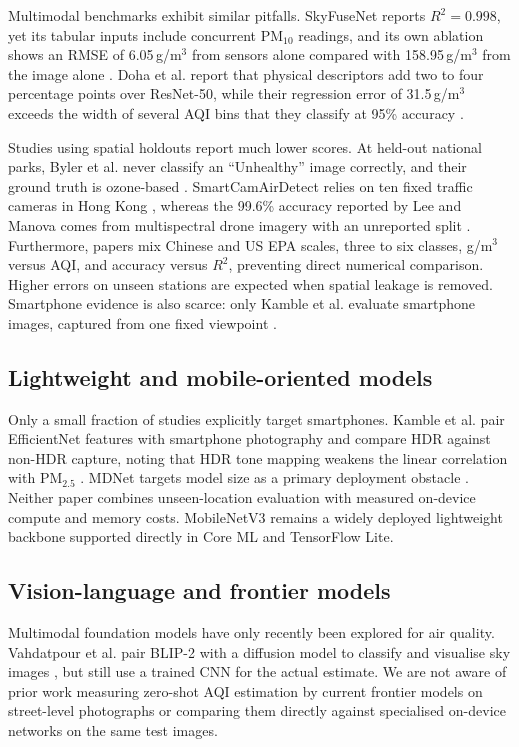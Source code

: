 \documentclass[conference]{IEEEtran}
\newcommand{\pmtwofive}{PM$_{2.5}$}
\begin{document}
Multimodal benchmarks exhibit similar pitfalls. SkyFuseNet reports $R^2=0.998$,
yet its tabular inputs include concurrent PM$_{10}$ readings, and its own
ablation shows an RMSE of 6.05\,\textmu g/m$^3$ from sensors alone compared with
158.95\,\textmu g/m$^3$ from the image alone
\cite{abdelsalamSkyFuseNetCrossAttentionSwin2026}. Doha et al. report that
physical descriptors add two to four percentage points over ResNet-50, while
their regression error of 31.5\,\textmu g/m$^3$ exceeds the width of several
AQI bins that they classify at 95\% accuracy
\cite{dohaDeepMultiTaskLearning2026}.

Studies using spatial holdouts report much lower scores. At held-out national
parks, Byler et al. never classify an ``Unhealthy'' image correctly, and their
ground truth is ozone-based \cite{bylerLocationGeneralizabilityImageBased2025}.
SmartCamAirDetect relies on ten fixed traffic cameras in Hong Kong
\cite{hanSmartCamAirDetectContrastiveApproach2025}, whereas the 99.6\% accuracy
reported by Lee and Manova comes from multispectral drone imagery with an
unreported split \cite{leeEnhancingPM25Detection2025}. Furthermore, papers mix
Chinese and US EPA scales, three to six classes, \textmu g/m$^3$ versus AQI,
and accuracy versus $R^2$, preventing direct numerical comparison. Higher errors
on unseen stations are expected when spatial leakage is removed. Smartphone
evidence is also scarce: only Kamble et al. evaluate smartphone images, captured
from one fixed viewpoint \cite{kambleMobileImageDrivenPM252025}.

\subsection{Lightweight and mobile-oriented models}
Only a small fraction of studies explicitly target smartphones. Kamble et al.
pair EfficientNet features with smartphone photography and compare HDR against
non-HDR capture, noting that HDR tone mapping weakens the linear correlation
with \pmtwofive{} \cite{kambleMobileImageDrivenPM252025}. MDNet targets model
size as a primary deployment obstacle \cite{wangLightweightAirQuality2024}.
Neither paper combines unseen-location evaluation with measured on-device
compute and memory costs. MobileNetV3 \cite{howard2019mobilenetv3} remains a
widely deployed lightweight backbone supported directly in Core ML and
TensorFlow Lite.

\subsection{Vision-language and frontier models}
Multimodal foundation models have only recently been explored for air quality.
Vahdatpour et al. pair BLIP-2 with a diffusion model to classify and visualise
sky images \cite{vahdatpourForecastingVisualizingAir2025}, but still use a
trained CNN for the actual estimate. We are not aware of prior work measuring
zero-shot AQI estimation by current frontier models on street-level photographs
or comparing them directly against specialised on-device networks on the same
test images.
\end{document}
